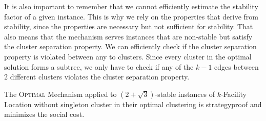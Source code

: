 It is also important to remember that we cannot efficiently estimate the stability factor of a given instance. This is why we rely on the properties that derive from stability, since the properties are necessary but not sufficient for stability. That also means that the mechanism serves instances that are non-stable but satisfy the cluster separation property. We can efficiently check if the cluster separation property is violated between any to clusters. Since every cluster in the optimal solution forms a subtree, we only have to check if any of the $k-1$ edges between 2 different clusters violates the cluster separation property.


\begin{theorem}
The \textsc{Optimal} Mechanism applied to $(2+\sqrt{3})$-stable instances of $k$-Facility Location without singleton cluster in their optimal clustering is strategyproof and minimizes the social cost. 
\end{theorem}

%

